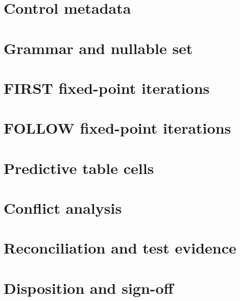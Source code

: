 \documentclass[11pt,letterpaper]{article}
\begin{document}
\makedoctitle\makedocsummary
\section{Control metadata}
\section{Grammar and nullable set}
\section{FIRST fixed-point iterations}
\section{FOLLOW fixed-point iterations}
\section{Predictive table cells}
\section{Conflict analysis}
\section{Reconciliation and test evidence}
\section{Disposition and sign-off}
\end{document}
